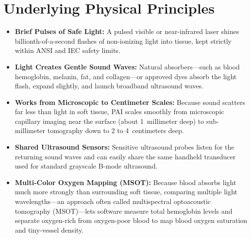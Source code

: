 \section{Underlying Physical Principles}
\begin{itemize}
  \item \textbf{Brief Pulses of Safe Light:} A pulsed visible or near-infrared laser shines billionth-of-a-second flashes of non-ionizing light into tissue, kept strictly within ANSI and IEC safety limits.
  \item \textbf{Light Creates Gentle Sound Waves:} Natural absorbers---such as blood hemoglobin, melanin, fat, and collagen---or approved dyes absorb the light flash, expand slightly, and launch broadband ultrasound waves.
  \item \textbf{Works from Microscopic to Centimeter Scales:} Because sound scatters far less than light in soft tissue, PAI scales smoothly from microscopic capillary imaging near the surface (about 1~millimeter deep) to sub-millimeter tomography down to 2 to 4~centimeters deep.
  \item \textbf{Shared Ultrasound Sensors:} Sensitive ultrasound probes listen for the returning sound waves and can easily share the same handheld transducer used for standard grayscale B-mode ultrasound.
  \item \textbf{Multi-Color Oxygen Mapping (MSOT):} Because blood absorbs light much more strongly than surrounding soft tissue, comparing multiple light wavelengths---an approach often called multispectral optoacoustic tomography (MSOT)---lets software measure total hemoglobin levels and separate oxygen-rich from oxygen-poor blood to map blood oxygen saturation and tiny-vessel density.
\end{itemize}

